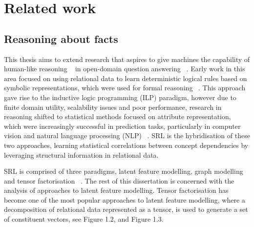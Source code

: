 \section{Related work} %

\subsection{Reasoning about facts} 

\noindent This thesis aims to extend research that aspires to give machines the capability of human-like reasoning \unskip~\citep{bordes2011learning} in open-domain question answering \unskip~\citep{hakimov2019evaluating}. Early work in this area focused on using relational data to learn deterministic logical rules based on symbolic representations, which were used for formal reasoning  \unskip~\citep{hohenecker2017deep}. This approach gave rise to the inductive logic programming (ILP) paradigm, however due to finite domain utility, scalability issues and poor performance, research in reasoning shifted to statistical methods focused on attribute representation, which were increasingly successful in prediction tasks, particularly in computer vision and natural language processing (NLP) \unskip~\citep{koller2007introduction}. SRL is the hybridisation of these two approaches, learning statistical correlations between concept dependencies by leveraging structural information in relational data. \par

\noindent SRL is comprised of three paradigms, latent feature modelling, graph modelling and tensor factorisation \unskip~\citep{nickel2015review}. The rest of this dissertation is concerned with the analysis of approaches to latent feature modelling. Tensor factorisation has become one of the most popular approaches to latent feature modelling, where a decomposition of relational data represented as a tensor, is used to generate a set of constituent vectors, see Figure 1.2, and Figure 1.3. \par

